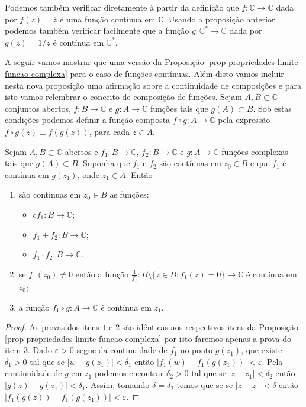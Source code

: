 Podemos também verificar diretamente à partir da definição 
que $f:\mathbb{C}\to\mathbb{C}$ dada por $f(z)=\overline{z}$ é uma função contínua em $\mathbb{C}$.
Usando a proposição anterior podemos também verificar facilmente que 
a função $g:\mathbb{C}^{*}\to\mathbb{C}$ dada por $g(z) = 1/z$ é contínua em $\mathbb{C}^{*}$.

A seguir vamos mostrar que uma versão da  Proposição \ref{prop-propriedades-limite-funcao-complexa}
para o caso de funções contínuas. Além disto vamos incluir nesta nova proposição uma afirmação sobre
a continuidade de composições e para isto vamos relembrar o conceito de composição de funções. 
Sejam $A,B\subset \mathbb{C}$ conjuntos abertos, $f:B\to\mathbb{C}$ e $g:A\to\mathbb{C}$
funções tais que $g(A)\subset B$. Sob estas condições podemos definir a função composta $f\circ g: A\to\mathbb{C}$
pela expressão $f\circ g(z) \equiv f(g(z))$, para cada $z\in A$.

\begin{proposicao}
Sejam $A,B\subset \mathbb{C}$ abertos e $f_1:B\to\mathbb{C}$, $f_2:B\to\mathbb{C}$ e $g:A\to\mathbb{C}$ 
funções complexas tais que $g(A)\subset B$. Suponha que $f_1$ e $f_2$ são contínuas em $z_0\in B$ e
que $f_1$ é contínua em $g(z_1)$, onde $z_1\in A$. Então 
\begin{enumerate}
	\item são contínuas em $z_0\in B$ as funções:
		\begin{itemize}
			\item  $cf_1:B\to\mathbb{C}$; 
			\item  $f_1+f_2:B\to\mathbb{C}$;
			\item $f_1\cdot f_2: B\to\mathbb{C}$.
		\end{itemize}

	\item se $f_1(z_0)\neq 0$ então a função $\displaystyle\frac{1}{f_1}:B\setminus\{z\in B: f_1(z)=0\} \to \mathbb{C}$
	é contínua em $z_0$;
	
	\item a função $f_1\circ g :A\to\mathbb{C}$ é contínua em $z_1$.
\end{enumerate}
\end{proposicao}

\begin{proof}
As provas dos itens $\mathit{1}$ e $\mathit{2}$ são idênticas aos respectivos itens da Proposição \ref{prop-propriedades-limite-funcao-complexa} por isto faremos apenas a prova do item $\mathit{3}$.
Dado $\varepsilon>0$ segue da continuidade de $f_1$ no ponto $g(z_1)$, 
que existe $\delta_1>0$ tal que se $|w-g(z_1)|<\delta_1$
então $|f_1(w)-f_1(g(z_1))|<\varepsilon$. Pela continuidade de $g$ em $z_1$ podemos encontrar $\delta_2>0$
tal que se $|z-z_1|<\delta_2$ então $|g(z)-g(z_1)|<\delta_1$. Assim,
tomando $\delta=\delta_2$ temos que se 
 se $|z-z_1|<\delta$ então $|f_1(g(z))-f_1(g(z_1))|<\varepsilon$.
\end{proof}


